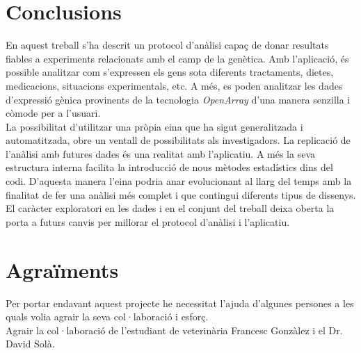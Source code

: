 \documentclass[english]{article}
\begin{document}
\section{Conclusions}
En aquest treball s'ha descrit un protocol d'anàlisi capa\c{c} de donar resultats fiables a experiments relacionats amb el camp de la genètica. Amb l'aplicació, és possible analitzar com s'expressen els gens sota diferents tractaments, dietes, medicacions, situacions experimentals, etc. A més, es poden analitzar les dades d'expressió gènica provinents de la tecnologia \textit{OpenArray} d'una manera senzilla i còmode per a l'usuari.
\\

La possibilitat d'utilitzar una pròpia eina que ha sigut generalitzada i automatitzada, obre un ventall de possibilitats als investigadors. La replicació de l'anàlisi amb futures dades és una realitat amb l'aplicatiu. A més la seva estructura interna facilita la introducció de nous mètodes estadístics dins del codi. D'aquesta manera l'eina podria anar evolucionant al llarg del temps amb la finalitat de fer una anàlisi més complet i que contingui diferents tipus de dissenys.
\\

El caràcter exploratori en les dades i en el conjunt del treball deixa oberta la porta a futurs canvis per millorar el protocol d'anàlisi i l'aplicatiu.
\section{Agraïments}
Per portar endavant aquest projecte he necessitat l'ajuda d'algunes persones a les quals volia agrair la seva col·laboració i esfor\c{c}.\\

Agrair la col·laboració de l'estudiant de veterinària Francesc Gonzàlez i el Dr. David Solà.\\
\end{document}
